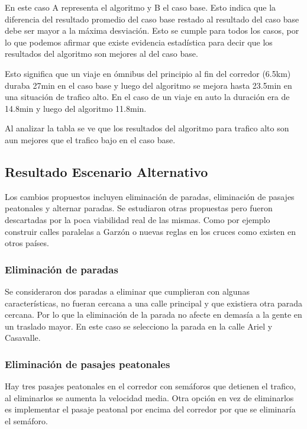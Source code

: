 En este caso A representa el algoritmo y B el caso base. Esto indica que la diferencia del resultado promedio del caso base restado al resultado del caso base debe ser mayor a la máxima desviación.
Esto se cumple para todos los casos, por lo que podemos afirmar que existe evidencia estadística para decir que los resultados del algoritmo son mejores al del caso base.


Esto significa que un viaje en ómnibus del principio al fin del corredor (6.5km) duraba 27min en el caso base y luego del algoritmo se mejora hasta 23.5min en una situación de trafico alto. En el caso de un viaje en auto la duración era de 14.8min y luego del algoritmo 11.8min.

Al analizar la tabla se ve que los resultados del algoritmo para trafico alto son aun mejores que el trafico bajo en el caso base. 





\subsection{Resultado Escenario Alternativo}
Los cambios propuestos incluyen eliminación de paradas, eliminación de pasajes peatonales y alternar paradas. Se estudiaron otras propuestas pero fueron descartadas por la poca viabilidad real de las mismas. Como por ejemplo construir calles paralelas a Garzón o nuevas reglas en los cruces como existen en otros países.




\subsubsection{Eliminación de paradas}
Se consideraron dos paradas a eliminar que cumplieran con algunas características, no fueran cercana a una calle principal y que existiera otra parada cercana. Por lo que la eliminación de la parada no afecte en demasía a la gente en un traslado mayor.
En este caso se selecciono la parada en la calle Ariel y Casavalle.



\subsubsection{Eliminación de pasajes peatonales}
Hay tres pasajes peatonales en el corredor con semáforos que detienen el trafico, al eliminarlos se aumenta la velocidad media. Otra opción en vez de eliminarlos es implementar el pasaje peatonal por encima del corredor por que se eliminaría el semáforo.

